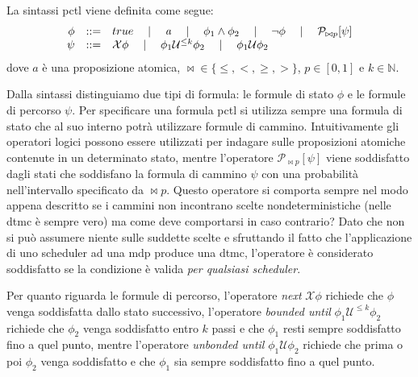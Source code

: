 \begin{mtdef}
	La sintassi \ac{pctl} viene definita come segue:
$$
\begin{array}{rcl}
	\phi &::=& true \quad\mid\quad \mathit{a} \quad\mid\quad \phi_1 \wedge \phi_2 \quad\mid\quad \neg\phi \quad\mid\quad \mathcal{P}_{\bowtie p}[\psi] \\
	\psi &::=& \mathcal{X}\phi \quad\mid\quad \phi_1 \mathcal{U}^{\leq k} \phi_2 \quad\mid\quad \phi_1 \mathcal{U} \phi_2 \\
\end{array}
$$
dove $\mathit{a}$ è una proposizione atomica, $\bowtie \in \{\leq,<,\geq,>\}$, $p \in[0,1]$ e $k \in \mathbb{N}$.
\end{mtdef}
Dalla sintassi distinguiamo due tipi di formula: le formule di stato $\phi$ e le formule di percorso $\psi$. Per specificare una formula \ac{pctl} si utilizza sempre una formula di stato che al suo interno potrà utilizzare formule di cammino. Intuitivamente gli operatori logici possono essere utilizzati per indagare sulle proposizioni atomiche contenute in un determinato stato, mentre l'operatore $\mathcal{P}_{\bowtie p}[\psi]$ viene soddisfatto dagli stati che soddisfano la formula di cammino $\psi$ con una probabilità nell'intervallo specificato da $\bowtie p$. Questo operatore si comporta sempre nel modo appena descritto se i cammini non incontrano scelte nondeterministiche (nelle \ac{dtmc} è sempre vero) ma come deve comportarsi in caso contrario? Dato che non si può assumere niente sulle suddette scelte e sfruttando il fatto che l'applicazione di uno scheduler ad una \ac{mdp} produce una \ac{dtmc}, l'operatore è considerato soddisfatto se la condizione è valida \emph{per qualsiasi scheduler}.

Per quanto riguarda le formule di percorso, l'operatore \emph{next} $\mathcal{X}\phi$ richiede che $\phi$ venga soddisfatta dallo stato successivo, l'operatore \emph{bounded until} $\phi_1 \mathcal{U}^{\leq k} \phi_2$ richiede che $\phi_2$ venga soddisfatto entro $k$ passi e che $\phi_1$ resti sempre soddisfatto fino a quel punto, mentre l'operatore \emph{unbonded until} $\phi_1 \mathcal{U} \phi_2$ richiede che prima o poi $\phi_2$ venga soddisfatto e che $\phi_1$ sia sempre soddisfatto fino a quel punto.

